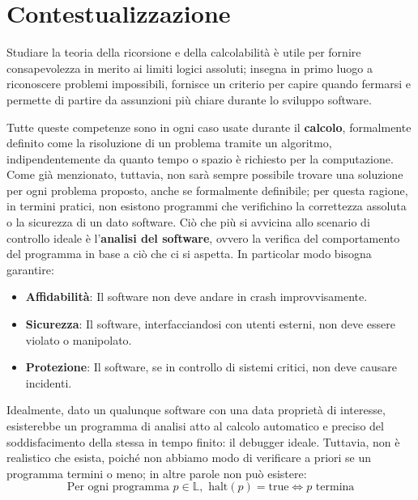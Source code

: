%

\section{Contestualizzazione}
Studiare la teoria della ricorsione e della calcolabilità è utile per fornire consapevolezza in merito ai limiti logici assoluti; insegna in primo luogo
a riconoscere problemi impossibili, fornisce un criterio per capire quando fermarsi e permette di partire da assunzioni più chiare durante lo sviluppo
software.\par
Tutte queste competenze sono in ogni caso usate durante il \textbf{calcolo}, formalmente definito come la risoluzione di un problema tramite un
algoritmo, indipendentemente da quanto tempo o spazio è richiesto per la computazione. Come già menzionato, tuttavia, non sarà sempre possibile trovare
una soluzione per ogni problema proposto, anche se formalmente definibile; per questa ragione, in termini pratici, non esistono programmi che
verifichino la correttezza assoluta o la sicurezza di un dato software. Ciò che più si avvicina allo scenario di controllo ideale è l'\textbf{analisi
del software}, ovvero la verifica del comportamento del programma in base a ciò che ci si aspetta. In particolar modo bisogna garantire: \begin{itemize}
	\item \textbf{Affidabilità}: Il software non deve andare in crash improvvisamente.
	\item \textbf{Sicurezza}: Il software, interfacciandosi con utenti esterni, non deve essere violato o manipolato.
	\item \textbf{Protezione}: Il software, se in controllo di sistemi critici, non deve causare incidenti.
\end{itemize}

\noindent Idealmente, dato un qualunque software con una data proprietà di interesse, esisterebbe un programma di analisi atto al calcolo automatico e
preciso del soddisfacimento della stessa in tempo finito: il debugger ideale. Tuttavia, non è realistico che esista, poiché non abbiamo modo di
verificare a priori se un programma termini o meno; in altre parole non può esistere: \[
	\text{Per ogni programma } p\in \mathbb{L}, \text{ halt}(p) = \text{true} \iff p\text{ termina}
\]

